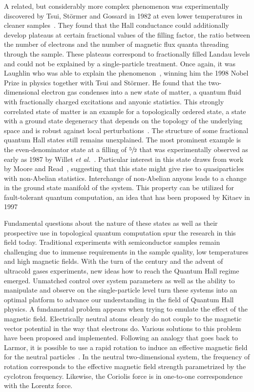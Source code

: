 A related, but considerably more complex phenomenon was experimentally discovered by Tsui, Störmer and Gossard in 1982 at even lower temperatures in cleaner samples~\cite{Tsui1982}.
They found that the Hall conductance could additionally develop plateaus at certain fractional values of the filling factor, the ratio between the number of electrons and the number of magnetic flux quanta threading through the sample.
These plateaus correspond to fractionally filled Landau levels and could not be explained by a single-particle treatment.
Once again, it was Laughlin who was able to explain the phenomenon~\cite{Laughlin1983}, winning him the 1998 Nobel Prize in physics together with Tsui and Störmer.
He found that the two-dimensional electron gas condenses into a new state of matter, a quantum fluid with fractionally charged excitations and anyonic statistics.
This strongly correlated state of matter is an example for a topologically ordered state, a state with a ground state degeneracy that depends on the topology of the underlying space and is robust against local perturbations~\cite{Wen1990,Wen1995}.
The structure of some fractional quantum Hall states still remains unexplained. The most prominent example is the even-denominator state at a filling of $\sfrac{5}{2}$ that was experimentally observed as early as 1987 by Willet \emph{et al.}~\cite{Willett1987}.
Particular interest in this state draws from work by Moore and Read~\cite{Moore1991}, suggesting that this state might give rise to quasiparticles with non-Abelian statistics.
Interchange of non-Abelian anyons leads to a change in the ground state manifold of the system. This property can be utilized for fault-tolerant quantum computation, an idea that has been proposed by Kitaev in 1997~\cite{Kitaev2003}

Fundamental questions about the nature of these states as well as their prospective use in topological quantum computation spur the research in this field today.
Traditional experiments with semiconductor samples remain challenging due to immense requirements in the sample quality, low temperatures and high magnetic fields.
With the turn of the century and the advent of ultracold gases experiments, new ideas how to reach the Quantum Hall regime emerged.
Unmatched control over system parameters as well as the ability to manipulate and observe on the single-particle level turn these systems into an optimal platform to advance our understanding in the field of Quantum Hall physics.
A fundamental problem appears when trying to emulate the effect of the magnetic field.
Electrically neutral atoms clearly do not couple to the magnetic vector potential in the way that electrons do.
Various solutions to this problem have been proposed and implemented.
Following an analogy that goes back to Larmor, it is possible to use a rapid rotation to induce an effective magnetic field for the neutral particles~\cite{Cooper2008,Fetter2009}.
In the neutral two-dimensional system, the frequency of rotation corresponds to the effective magnetic field strength parametrized by the cyclotron frequency.
Likewise, the Coriolis force is in one-to-one correspondence with the Lorentz force.

